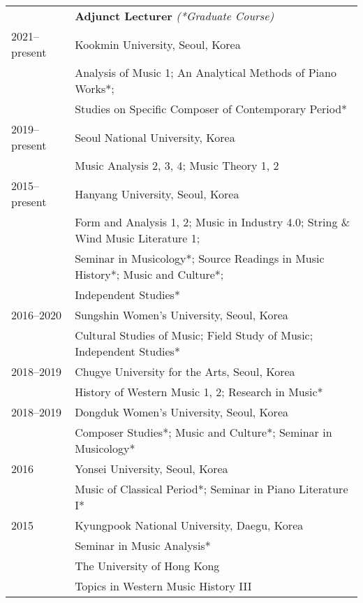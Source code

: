 \documentclass[a4paper,11pt,draft]{article}
\begin{document}
  \hspace*{-0.25cm}
  \begin{tabular}{p{2.5cm} l}
    & \textbf{Adjunct Lecturer} \textit{(*Graduate Course)}\\
    2021–present & Kookmin University, Seoul, Korea\\
    & Analysis of Music 1; An Analytical Methods of Piano Works*;\\
    & Studies on Specific Composer of Contemporary Period*\\[1mm]
    
    2019–present & Seoul National University, Korea\\
    & Music Analysis 2, 3, 4; Music Theory 1, 2\\[1mm]
    
    2015–present & Hanyang University, Seoul, Korea\\
    & Form and Analysis 1, 2; Music in Industry 4.0; String \& Wind Music Literature 1;\\
    & Seminar in Musicology*; Source Readings in Music History*; Music and Culture*;\\
    & Independent Studies*\\[1mm]
    
    2016–2020 & Sungshin Women's University, Seoul, Korea\\
    & Cultural Studies of Music; Field Study of Music; Independent Studies*\\[1mm]
    
    2018–2019 & Chugye University for the Arts, Seoul, Korea\\
    & History of Western Music 1, 2; Research in Music*\\[1mm]
    
    2018–2019 & Dongduk Women's University, Seoul, Korea\\
    & Composer Studies*; Music and Culture*; Seminar in Musicology*\\[1mm]
    
    2016 & Yonsei University, Seoul, Korea\\
    & Music of Classical Period*; Seminar in Piano Literature I*\\[1mm]
    
    2015 & Kyungpook National University, Daegu, Korea\\
    & Seminar in Music Analysis*\\[1mm]
    
    & The University of Hong Kong\\
    & Topics in Western Music History III\\[1mm]
    

\end{tabular}
\end{document}
